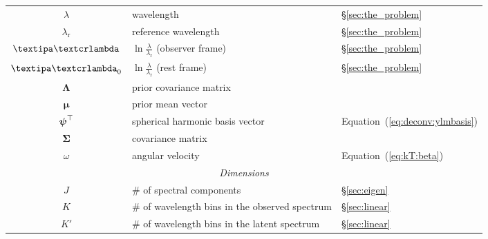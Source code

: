 \documentclass[modern]{aastex631}
\begin{document}
\begin{center}
\begin{longtable}{cll}
        $\lambda$                                           & wavelength                                                   & \S\ref{sec:the_problem}                    \\
        $\lambda_\mathrm{r}$                                & reference wavelength                                         & \S\ref{sec:the_problem}                    \\
        $\lnlam$                                            & $\ln\frac{\lambda}{\lambda_\mathrm{r}}$ (observer frame) & \S\ref{sec:the_problem}                    \\
        $\lnlam_0$                                          & $\ln\frac{\lambda}{\lambda_\mathrm{r}}$ (rest frame)     & \S\ref{sec:the_problem}                    \\
        $\boldsymbol{\Lambda}$                              & prior covariance matrix                                      &                                            \\
        $\boldsymbol{\mu}$                                  & prior mean vector                                            &                                            \\
        $\boldsymbol{\psi}^\top$                                         & spherical harmonic basis vector                              & Equation~(\ref{eq:deconv:ylmbasis})        \\
        $\boldsymbol{\Sigma}$                               & covariance matrix                                            &                                            \\
        $\omega$                                            & angular velocity                                             & Equation~(\ref{eq:kT:beta})                \\
        \midrule
        \multicolumn{3}{c}{\emph{Dimensions}}                                                                                                                           \\
        \midrule
        $J$                                                 & \# of spectral components                                    & \S\ref{sec:eigen}                          \\
        $K$                                                 & \# of wavelength bins in the observed spectrum               & \S\ref{sec:linear}                         \\
        $K'$                                                & \# of wavelength bins in the latent spectrum                 & \S\ref{sec:linear}                         \\

\end{longtable}
\end{center}
\end{document}
